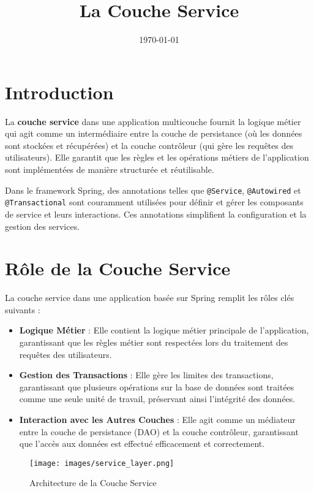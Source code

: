 \documentclass{article}
\title{La Couche Service}
\date{\today}
\begin{document}
\maketitle

\section{Introduction}
La \textbf{couche service} dans une application multicouche fournit la logique métier qui agit comme un intermédiaire entre la couche de persistance (où les données sont stockées et récupérées) et la couche contrôleur (qui gère les requêtes des utilisateurs). Elle garantit que les règles et les opérations métiers de l'application sont implémentées de manière structurée et réutilisable.

Dans le framework Spring, des annotations telles que \texttt{@Service}, \texttt{@Autowired} et \texttt{@Transactional} sont couramment utilisées pour définir et gérer les composants de service et leurs interactions. Ces annotations simplifient la configuration et la gestion des services.

\section{Rôle de la Couche Service}
La couche service dans une application basée sur Spring remplit les rôles clés suivants :

\begin{itemize}
    \item \textbf{Logique Métier} : Elle contient la logique métier principale de l'application, garantissant que les règles métier sont respectées lors du traitement des requêtes des utilisateurs.
    \item \textbf{Gestion des Transactions} : Elle gère les limites des transactions, garantissant que plusieurs opérations sur la base de données sont traitées comme une seule unité de travail, préservant ainsi l'intégrité des données.
    \item \textbf{Interaction avec les Autres Couches} : Elle agit comme un médiateur entre la couche de persistance (DAO) et la couche contrôleur, garantissant que l'accès aux données est effectué efficacement et correctement.
\end{itemize}

\begin{figure}[H]
    \centering
    \begin{framed}
        \texttt{[image: images/service\_layer.png]}
    \end{framed}
    \caption{Architecture de la Couche Service}
    \label{fig:service-layer}
\end{figure}
\end{document}

